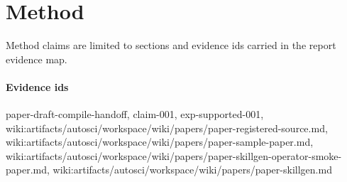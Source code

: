 \section{Method}
Method claims are limited to sections and evidence ids carried in the report evidence map.

\paragraph{Evidence ids} paper-draft-compile-handoff, claim-001, exp-supported-001, wiki:artifacts/autosci/workspace/wiki/papers/paper-registered-source.md, wiki:artifacts/autosci/workspace/wiki/papers/paper-sample-paper.md, wiki:artifacts/autosci/workspace/wiki/papers/paper-skillgen-operator-smoke-paper.md, wiki:artifacts/autosci/workspace/wiki/papers/paper-skillgen.md
